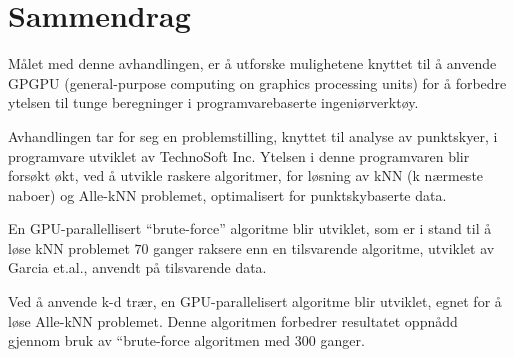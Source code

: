 
\section*{Sammendrag}


M{\aa}let med denne avhandlingen, er {\aa} utforske mulighetene knyttet til {\aa} anvende GPGPU (general-purpose computing on graphics processing units) for {\aa} forbedre ytelsen til tunge beregninger i programvarebaserte ingeni{\o}rverkt{\o}y.

Avhandlingen tar for seg en problemstilling, knyttet til analyse av punktskyer, i programvare utviklet av TechnoSoft Inc. Ytelsen i denne programvaren blir fors{\o}kt {\o}kt, ved {\aa} utvikle raskere algoritmer, for l{\o}sning av kNN (k n{\ae}rmeste naboer) og Alle-kNN problemet, optimalisert for punktskybaserte data.

En GPU-parallellisert “brute-force” algoritme blir utviklet, som er i stand til {\aa} l{\o}se kNN problemet $70$ ganger raksere enn en tilsvarende algoritme, utviklet av Garcia et.al.\cite{Garcia2008}, anvendt p{\aa} tilsvarende data.

Ved {\aa} anvende k-d tr{\ae}r, en GPU-parallelisert algoritme blir utviklet, egnet for {\aa} l{\o}se Alle-kNN problemet. Denne algoritmen forbedrer resultatet oppn{\aa}dd gjennom bruk av “brute-force algoritmen med 300 ganger.


\clearpage\

